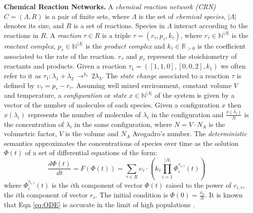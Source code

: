 \documentclass{llncs}
\begin{document}
\textbf{Chemical Reaction Networks.}
A \emph{chemical reaction network (CRN)} $C=(\Lambda,R)$ is a pair of finite sets, where $\Lambda$ is the set of \emph{chemical species}, $|\Lambda|$ denotes its size, and $R$ is a set of reactions. Species in $\Lambda$ interact according to the reactions in $R$. A \emph{reaction} $\tau \in R$ is a triple $\tau=(r_{\tau},p_{\tau},k_{\tau})$, where $r_{\tau} \in  \mathbb{N}^{|\Lambda|}$ is the \emph{reactant complex}, 
$p_{\tau} \in  \mathbb{N}^{|\Lambda|}$ is the \emph{product complex} and $k_{\tau} \in \mathbb{R}_{>0} $ is the coefficient associated to the rate of the reaction. $r_{\tau}$ and $p_{\tau}$  represent the stoichiometry of reactants and products.
Given a reaction $\tau_1=(  [1,1,0],[0,0,2],k_1 )$ we often refer to it as $\tau_1 : \lambda_1 + \lambda_2 \, \rightarrow^{k_1}  \,    2\lambda_3 $.
The \emph{state change} associated to a reaction $\tau$ is defined by $\upsilon_{\tau}=p_{\tau} - r_{\tau}$. 
Assuming well mixed environment, constant volume $V$ and temperature, a \emph{configuration} or \emph{state} $x \in \mathbb{N}^{|\Lambda|}$ of the system is given by a vector of the number of molecules of each species. 
Given a configuration $x$ then $x(\lambda_i)$ represents the number of molecules of $\lambda_i$ in the configuration and $\frac{x(\lambda_i)}{N}$ is the concentration of $\lambda_i$ in the same configuration, where $N=V \cdot N_A$ is the volumetric factor, $V$ is the volume and $N_A$ Avogadro's number.
The \emph{deterministic} semantics approximates the concentrations of species over time as the solution $\Phi(t)$ of a set of differential equations of the form:
\begin{equation}
\frac{d \Phi(t)}{dt}=F(\Phi(t))=\sum_{\tau \in R}\upsilon_{\tau}\cdot ( k_\tau \prod_{i=1}^{|\Lambda|}\Phi_{i}^{r_{i,\tau}}(t))
\label{eq:ODE}
\end{equation}
where $\Phi_{i}^{r_{i,\tau}}(t)$ is the $i$th component of vector $\Phi(t)$ raised to the power of $r_{i,\tau}$, the $i$th component of vector $r_{\tau}$. The initial condition is $\Phi(0)=\frac{x_0}{N}$. It is known that Eqn \eqref{eq:ODE} is accurate in the limit of high populations \cite{ethier2009markov}. %
\end{document}
